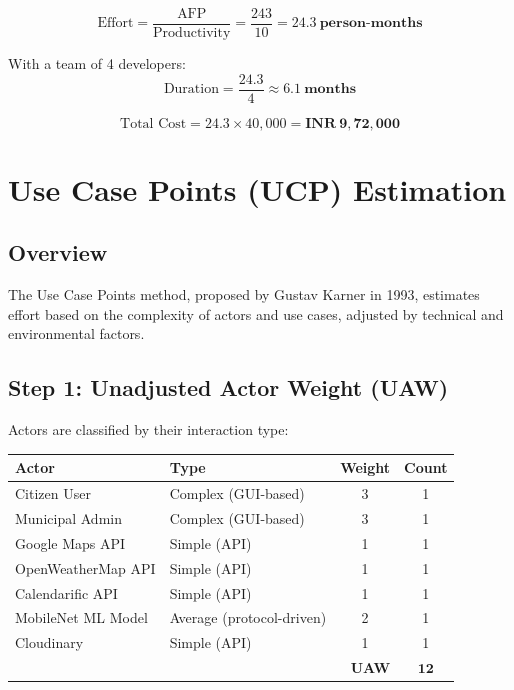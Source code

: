 \documentclass[12pt,a4paper]{article}
\begin{document}
\[
\text{Effort} = \frac{\text{AFP}}{\text{Productivity}} = \frac{243}{10} = \mathbf{24.3~\text{person-months}}
\]

With a team of 4 developers:
\[
\text{Duration} = \frac{24.3}{4} \approx \mathbf{6.1~\text{months}}
\]

\[
\text{Total Cost} = 24.3 \times 40{,}000 = \mathbf{\textrm{INR}~9,72,000}
\]

\section{Use Case Points (UCP) Estimation}

\subsection{Overview}
The Use Case Points method, proposed by Gustav Karner in 1993, estimates effort based on the complexity of actors and use cases, adjusted by technical and environmental factors.

\subsection{Step 1: Unadjusted Actor Weight (UAW)}

Actors are classified by their interaction type:
\begin{center}
\begin{tabular}{llcc}
\toprule
\textbf{Actor} & \textbf{Type} & \textbf{Weight} & \textbf{Count} \\
\midrule
Citizen User & Complex (GUI-based) & 3 & 1 \\
Municipal Admin & Complex (GUI-based) & 3 & 1 \\
Google Maps API & Simple (API) & 1 & 1 \\
OpenWeatherMap API & Simple (API) & 1 & 1 \\
Calendarific API & Simple (API) & 1 & 1 \\
MobileNet ML Model & Average (protocol-driven) & 2 & 1 \\
Cloudinary & Simple (API) & 1 & 1 \\
\midrule
\multicolumn{3}{r}{\textbf{UAW}} & $\mathbf{12}$ \\
\bottomrule
\end{tabular}
\end{center}
\end{document}
